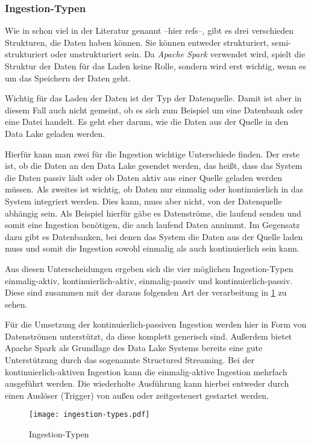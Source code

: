 \subsubsection{Ingestion-Typen}
Wie in schon viel in der Literatur genannt --hier refs--, gibt es drei verschieden Strukturen, die Daten haben können.
Sie können entweder strukturiert, semi-strukturiert oder unstrukturiert sein.
Da \textit{Apache Spark} verwendet wird, spielt die Struktur der Daten für das Laden keine Rolle, sondern wird erst wichtig, wenn es um das Speichern der Daten geht.

Wichtig für das Laden der Daten ist der Typ der Datenquelle.
Damit ist aber in diesem Fall auch nicht gemeint, ob es sich zum Beispiel um eine Datenbank oder eine Datei handelt.
Es geht eher darum, wie die Daten aus der Quelle in den Data Lake geladen werden.

Hierfür kann man zwei für die Ingestion wichtige Unterschiede finden.
Der erste ist, ob die Daten an den Data Lake gesendet werden, das heißt, dass das System die Daten passiv lädt oder ob Daten aktiv aus einer Quelle geladen werden müssen.
Als zweites ist wichtig, ob Daten nur einmalig oder kontinuierlich in das System integriert werden.
Dies kann, muss aber nicht, von der Datenquelle abhängig sein.
Als Beispiel hierfür gäbe es Datenströme, die laufend senden und somit eine Ingestion benötigen, die auch laufend Daten annimmt.
Im Gegensatz dazu gibt es Datenbanken, bei denen das System die Daten aus der Quelle laden muss und somit die Ingestion sowohl einmalig als auch kontinuierlich sein kann.

Aus diesen Unterscheidungen ergeben sich die vier möglichen Ingestion-Typen einmalig-aktiv, kontinuierlich-aktiv, einmalig-passiv und kontinuierlich-passiv.
Diese sind zusammen mit der daraus folgenden Art der verarbeitung in \ref{fig:ingestion_types} zu sehen.

Für die Umsetzung der kontinuierlich-passiven Ingestion werden hier in Form von Datenströmen unterstützt, da diese komplett generisch sind.
Außerdem bietet Apache Spark als Grundlage des Data Lake Systems bereits eine gute Unterstützung durch das sogenannte Structured Streaming.
Bei der kontinuierlich-aktiven Ingestion kann die einmalig-aktive Ingestion mehrfach ausgeführt werden.
Die wiederholte Ausführung kann hierbei entweder durch einen Auslöser (Trigger) von außen oder zeitgesteuert gestartet werden.

\begin{figure}
    \centering
    \texttt{[image: ingestion-types.pdf]}
    \caption{Ingestion-Typen}
    \label{fig:ingestion_types}
\end{figure}

